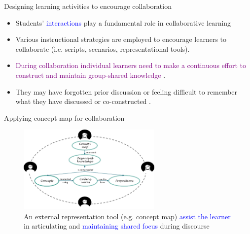 \begin{frame}{Designing learning activities to encourage collaboration}
    \begin{itemize}
        \item<1-> Students' \textcolor{blue}{interactions} play a fundamental role in collaborative learning 
        \cite{Baines2009ImprovingStudy,Webb2009TheClassroom}
        \item<1-> Various instructional strategies are employed to encourage learners to collaborate 
        (i.e. scripts, scenarios, representational tools).
        \item<2-> \textcolor{purple}{During collaboration individual learners need to make a continuous effort 
        to construct and maintain group-shared knowledge \cite{Roschelle1995TheSolving}}. 
        \item<2-> They may have forgotten prior discussion or feeling difficult to remember 
        what they have discussed or co-constructed \cite{Jeong2016SevenHelp}.
    \end{itemize}
\end{frame}

\begin{frame}{Applying concept map for collaboration}

    \begin{figure}[tb]
        \begin{center}
            \includegraphics[width=70mm]{images/ccm.png}
        \end{center}
        \caption{An external representation tool (e.g. concept map) \textcolor{blue}{assist the learner} in articulating and \textcolor{blue}{maintaining shared focus} during discourse \cite{Fischer2002FosteringTools,Suthers2006TechnologyCSCL,vanBoxtel2002CollaborativeDiscourse}}
        \label{intro::ccm}
    \end{figure}
\end{frame}   

